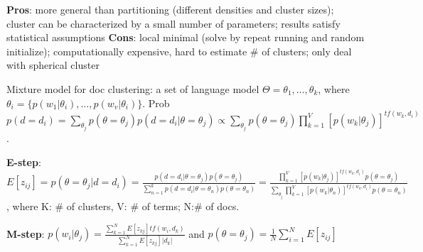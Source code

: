 \documentclass[10pt,twocolumn]{article}
\begin{document}
\textbf{Pros}: more general than partitioning (different densities and cluster sizes); cluster can be characterized by a small number of parameters; results satisfy statistical assumptions 
\textbf{Cons}: local minimal (solve by repeat running and random initialize); computationally expensive, hard to estimate \# of clusters; only deal with spherical cluster

Mixture model for doc clustering: a set of language model $\Theta={\theta_1,\dots,\theta_k}$, where $\theta_i=\{p(w_1|\theta_i),\dots,p(w_v|\theta_i)\}$. Prob $p(d=d_i)=\sum_{\theta_j}p(\theta=\theta_j)p(d=d_i|\theta=\theta_j)\varpropto \sum_{\theta_j}p(\theta=\theta_j)\prod_{k=1}^V[p(w_k|\theta_j)]^{tf(w_k,d_i)}$. 

\textbf{E-step}: $E[z_{ij}]=p(\theta=\theta_j|d=d_i)=\frac{p(d=d_i|\theta=\theta_j)p(\theta=\theta_j)}{\sum_{n=1}^kp(d=d_i|\theta=\theta_n)p(\theta=\theta_n)}=\frac{\prod_{k=1}^V[p(w_k|\theta_j)]^{tf(w_k,d_i)}p(\theta=\theta_j)}{\sum_{\theta_j}\prod_{k=1}^V[p(w_k|\theta_n)]^{tf(w_k,d_i)}p(\theta=\theta_n)}$, where K: \# of clusters, V: \# of terms; N:\# of docs. 

\textbf{M-step}: $p(w_i|\theta_j)=\frac{\sum_{k=1}^NE[z_{kj}]tf(w_i,d_k)}{\sum_{k=1}^NE[z_{kj}]|d_k|}$ and $p(\theta=\theta_j)=\frac{1}{N}\sum_{i=1}^NE[z_{ij}]$


\end{document}
